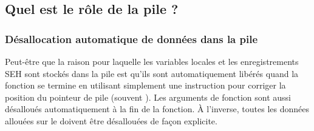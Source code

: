 
\subsection{Quel est le rôle de la pile ?}








\subsubsection{Désallocation automatique de données dans la pile}

Peut-être que la raison pour laquelle les variables locales et les enregistrements SEH sont stockés dans la
pile est qu'ils sont automatiquement libérés quand la fonction se termine en utilisant simplement une
instruction pour corriger la position du pointeur de pile (souvent \ADD).
Les arguments de fonction sont aussi désalloués automatiquement à la fin de la fonction.
À l'inverse, toutes les données allouées sur le  doivent être désallouées de façon explicite.



